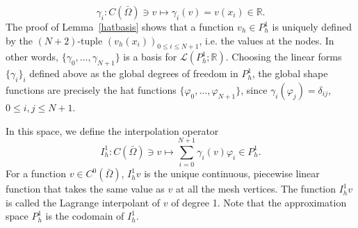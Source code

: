 \begin{equation*}
\gamma_i: C(\bar{\Omega}) \ni v \mapsto \gamma_i(v) = v(x_i) \in \mathbb{R}.
\end{equation*}
The proof of Lemma~\ref{hatbasis} shows that a function $v_h \in P_h^1$ is uniquely defined by the $(N+2)$-tuple $(v_h(x_i))_{0 \le i \le N+1}$, i.e. the values at the nodes. In other words, $\{\gamma_0, \dots, \gamma_{N+1}\}$ is a basis for $\mathcal{L}(P_h^1; \mathbb{R})$. Choosing the linear forms $\{\gamma_i\}_i$ defined above as the global degrees of freedom in $P_h^1$, the global shape functions are precisely the hat functions $\{\varphi_0, \dots, \varphi_{N+1}\}$, since $\gamma_i(\varphi_j) = \delta_{ij}$, $0 \le i,j \le N+1$.


In this space, we define the interpolation operator
\begin{equation*}
I_h^1: C(\bar{\Omega}) \ni v \mapsto \sum_{i=0}^{N+1} \gamma_i(v) \varphi_i \in P_h^1.
\end{equation*}
For a function $v \in C^0(\bar{\Omega})$, $I_h^1 v$ is the unique continuous, piecewise linear function that takes the same value as $v$ at all the mesh vertices. The function $I_h^1 v$ is called the Lagrange interpolant of $v$ of degree 1. Note that the approximation space $P_h^1$ is the codomain of $I_h^1$. 

